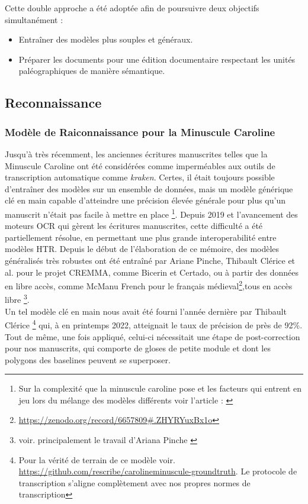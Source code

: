 \documentclass[a4paper, twoside, 12pt]{book}
\begin{document}
Cette double approche a été adoptée afin de poursuivre deux objectifs simultanément :
\begin{itemize}
\item Entraîner des modèles plus souples et généraux.
\item Préparer les documents pour une édition documentaire respectant les unités paléographiques de manière sémantique.
\end{itemize}



\subsection{Reconnaissance}


\subsubsection{Modèle de Raiconnaissance pour la Minuscule Caroline}
Jusqu'à très récemment, les anciennes écritures manuscrites telles que la Minuscule Caroline ont été considérées comme imperméables aux outils de transcription automatique comme \textit{kraken}. Certes, il était toujours possible d'entraîner des modèles sur un ensemble de données, mais un modèle générique \og{} clé en main \fg{} capable d'atteindre une précision élevée générale pour plus qu'un manuscrit n'était pas facile à mettre en place \footnote{Sur la complexité que la minuscule caroline pose et les facteurs qui entrent en jeu lors du mélange des modèles différents voir l'article : \cite{hawk2018modelling}}. Depuis 2019 et l'avancement des moteurs OCR qui gèrent les écritures manuscrites, cette difficulté a été partiellement résolue, en permettant une plus grande interoperabilité entre modèles HTR. Depuis le début de l'élaboration de ce mémoire, des modèles généralisés très robustes ont été entraîné par Ariane Pinche, Thibault Clérice et al. pour le projet CREMMA, comme Bicerin et Certado, ou à partir des données en libre accès, comme McManu French pour le français médieval\footnote{ \url{https://zenodo.org/record/6657809\#.ZHYRYuxBx1o}},tous en accès libre \footnote{voir. principalement le travail d'Ariana Pinche \cite{pinche:generic}}. \\


Un tel modèle \og{} clé en main \fg{} nous avait été fourni l'année dernière par Thibault Clérice \footnote{Pour la vérité de terrain de ce modèle voir. \url{https://github.com/rescribe/carolineminuscule-groundtruth}. Le protocole de transcription s'aligne complètement avec nos propres normes de transcription} qui, à en printemps 2022, atteignait le taux de précision  de près de 92\%. Tout de même, une fois appliqué, celui-ci  nécessitait une étape de post-correction pour nos manuscrits, qui comporte de gloses de petite module et dont les polygons des baselines peuvent se superposer.\\
\end{document}
